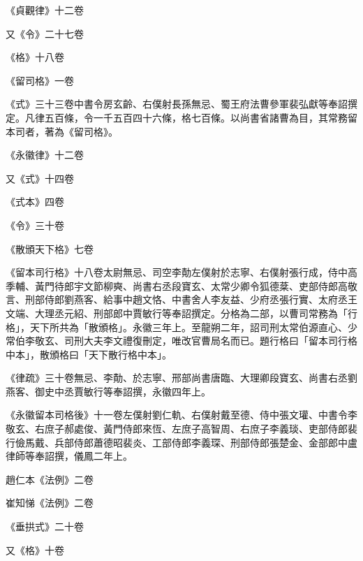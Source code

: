 \begin{pinyinscope}
 《貞觀律》十二卷



 又《令》二十七卷



 《格》十八卷



 《留司格》一卷



 《式》三十三卷中書令房玄齡、右僕射長孫無忌、蜀王府法曹參軍裴弘獻等奉詔撰定。凡律五百條，令一千五百四十六條，格七百條。以尚書省諸曹為目，其常務留本司者，著為《留司格》。



 《永徽律》十二卷



 又《式》十四卷



 《式本》四卷



 《令》三十卷



 《散頒天下格》七卷



 《留本司行格》十八卷太尉無忌、司空李勣左僕射於志寧、右僕射張行成，侍中高季輔、黃門待郎宇文節柳奭、尚書右丞段寶玄、太常少卿令狐德棻、吏部侍郎高敬言、刑部侍郎劉燕客、給事中趙文恪、中書舍人李友益、少府丞張行實、太府丞王文端、大理丞元紹、刑部郎中賈敏行等奉詔撰定。分格為二部，以曹司常務為「行格」，天下所共為「散頒格」。永徽三年上。至龍朔二年，詔司刑太常伯源直心、少常伯李敬玄、司刑大夫李文禮復刪定，唯改官曹局名而已。題行格曰「留本司行格中本」，散頒格曰「天下散行格中本」。



 《律疏》三十卷無忌、李勣、於志寧、邢部尚書唐臨、大理卿段寶玄、尚書右丞劉燕客、御史中丞賈敏行等奉詔撰，永徽四年上。



 《永徽留本司格後》十一卷左僕射劉仁軌、右僕射戴至德、侍中張文瓘、中書令李敬玄、右庶子郝處俊、黃門侍郎來恆、左庶子高智周、右庶子李義琰、吏部侍郎裴行儉馬戴、兵部侍郎蕭德昭裴炎、工部侍郎李義琛、刑部侍郎張楚金、金部郎中盧律師等奉詔撰，儀鳳二年上。



 趙仁本《法例》二卷



 崔知悌《法例》二卷



 《垂拱式》二十卷



 又《格》十卷




\end{pinyinscope}
